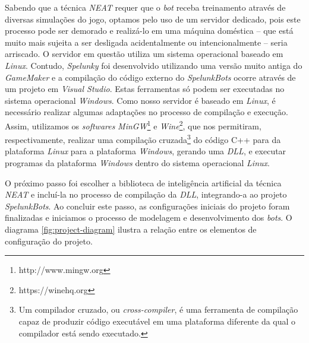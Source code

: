 Sabendo que a técnica \textit{NEAT} requer que o \textit{bot} receba treinamento
através de diversas simulações do jogo, optamos pelo uso de um servidor
dedicado, pois este processo pode ser demorado e realizá-lo em uma máquina
doméstica -- que está muito mais sujeita a ser desligada acidentalmente ou
intencionalmente -- seria arriscado. O servidor em questão utiliza um sistema
operacional baseado em \textit{Linux}.  Contudo, \textit{Spelunky} foi
desenvolvido utilizando uma versão muito antiga do \textit{GameMaker} e a
compilação do código externo do \textit{SpelunkBots} ocorre através de um
projeto em \textit{Visual Studio}.  Estas ferramentas só podem ser executadas no
sistema operacional \textit{Windows}. Como nosso servidor é baseado em
\textit{Linux}, é necessário realizar algumas adaptações no processo de
compilação e execução. Assim, utilizamos os \textit{softwares}
\textit{MinGW}\footnote{http://www.mingw.org} e
\textit{Wine}\footnote{https://winehq.org}, que nos permitiram, respectivamente,
realizar uma compilação cruzada\footnote{Um compilador cruzado, ou
	\textit{cross-compiler}, é uma ferramenta de compilação capaz de produzir
código executável em uma plataforma diferente da qual o compilador está sendo
executado.} do código C++ para da plataforma \textit{Linux} para a plataforma
\textit{Windows}, gerando uma \textit{DLL}, e executar programas da plataforma
\textit{Windows} dentro do sistema operacional \textit{Linux}.

O próximo passo foi escolher a biblioteca de inteligência artificial da técnica
\textit{NEAT} e incluí-la no processo de compilação da \textit{DLL},
integrando-a ao projeto \textit{SpelunkBots}. Ao concluir este passo, as
configurações iniciais do projeto foram finalizadas e iniciamos o processo de
modelagem e desenvolvimento dos \textit{bots}. O diagrama
\ref{fig:project-diagram} ilustra a relação entre os elementos de configuração
do projeto.

